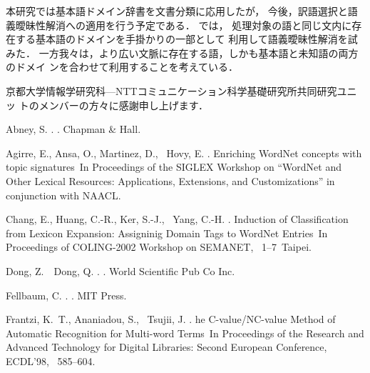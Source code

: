 \documentclass[japanese]{jnlp_1.4}
\begin{document}
本研究では基本語ドメイン辞書を文書分類に応用したが，
今後，訳語選択と語義曖昧性解消への適用を行う予定である．
では，
処理対象の語と同じ文内に存在する基本語のドメインを手掛かりの一部として
利用して語義曖昧性解消を試みた．
一方我々は，より広い文脈に存在する語，しかも基本語と未知語の両方のドメイ
ンを合わせて利用することを考えている．


\acknowledgment

京都大学情報学研究科—NTTコミュニケーション科学基礎研究所共同研究ユニッ
トのメンバーの方々に感謝申し上げます．


\begin{thebibliography}{}

Abney, S. \BBCP.
.
\newblock Chapman \& Hall.

Agirre, E., Ansa, O., Martinez, D., \BBA\ Hovy, E. \BBCP.
\newblock \BBOQ Enriching WordNet concepts with topic signatures\BBCQ\
\newblock In {\Bem Proceedings of the SIGLEX Workshop on ``WordNet and Other
  Lexical Resources: Applications, Extensions, and Customizations'' in
  conjunction with NAACL}.

Chang, E., Huang, C.-R., Ker, S.-J., \BBA\ Yang, C.-H. \BBCP.
\newblock \BBOQ Induction of Classification from Lexicon Expansion: Assigninig
  Domain Tags to WordNet Entries\BBCQ\
\newblock In {\Bem Proceedings of COLING-2002 Workshop on SEMANET},
  \mbox{\BPGS\ 1--7}\ Taipei.

Dong, Z.\BBACOMMA\ \BBA\ Dong, Q. \BBCP.
.
\newblock World Scientific Pub Co Inc.

Fellbaum, C. \BBOP 1998\BBCP.
.
\newblock MIT Press.

Frantzi, K.~T., Ananiadou, S., \BBA\ Tsujii, J. \BBCP.
\newblock \BBOQ {T}he {C}-value/{NC}-value {M}ethod of {A}utomatic
  {R}ecognition for {M}ulti-word {T}erms\BBCQ\
\newblock In {\Bem Proceedings of the Research and Advanced Technology for
  Digital Libraries: Second European Conference, ECDL'98}, \mbox{\BPGS\
  585--604}.


\end{thebibliography}
\end{document}
